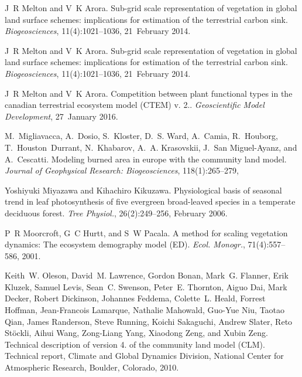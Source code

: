 \begin{DoxyDescription}
\item[\label{_CITEREF_Melton2014-xk}%
\mbox{[}40\mbox{]}]J~R Melton and V~K Arora. Sub-\/grid scale representation of vegetation in global land surface schemes\+: implications for estimation of the terrestrial carbon sink. {\itshape Biogeosciences}, 11(4)\+:1021--1036, 21~February 2014. 


\item[\label{_CITEREF_Melton2014-xy}%
\mbox{[}41\mbox{]}]J~R Melton and V~K Arora. Sub-\/grid scale representation of vegetation in global land surface schemes\+: implications for estimation of the terrestrial carbon sink. {\itshape Biogeosciences}, 11(4)\+:1021--1036, 21~February 2014. 


\item[\label{_CITEREF_Melton2016-zx}%
\mbox{[}42\mbox{]}]J~R Melton and V~K Arora. Competition between plant functional types in the canadian terrestrial ecosystem model (C\+T\+E\+M) v. 2.. {\itshape Geoscientific Model Development}, 27~January 2016. 


\item[\label{_CITEREF_Migliavacca2013-eh}%
\mbox{[}43\mbox{]}]M.~Migliavacca, A.~Dosio, S.~Kloster, D.~S. Ward, A.~Camia, R.~Houborg, T.~Houston~Durrant, N.~Khabarov, A.~A. Krasovskii, J.~San Miguel-\/\+Ayanz, and A.~Cescatti. Modeling burned area in europe with the community land model. {\itshape Journal of Geophysical Research\+: Biogeosciences}, 118(1)\+:265--279,
\begin{DoxyEnumerate}
\item 
\end{DoxyEnumerate}


\item[\label{_CITEREF_Miyazawa2006-so}%
\mbox{[}44\mbox{]}]Yoshiyuki Miyazawa and Kihachiro Kikuzawa. Physiological basis of seasonal trend in leaf photosynthesis of five evergreen broad-\/leaved species in a temperate deciduous forest. {\itshape Tree Physiol.}, 26(2)\+:249--256, February 2006.


\item[\label{_CITEREF_Moorcroft2001-co}%
\mbox{[}45\mbox{]}]P~R Moorcroft, G~C Hurtt, and S~W Pacala. A method for scaling vegetation dynamics\+: The ecosystem demography model (E\+D). {\itshape Ecol. Monogr.}, 71(4)\+:557--586, 2001. 


\item[\label{_CITEREF_Oleson2010-c88}%
\mbox{[}46\mbox{]}]Keith~W. Oleson, David~M. Lawrence, Gordon Bonan, Mark~G. Flanner, Erik Kluzek, Samuel Levis, Sean~C. Swenson, Peter~E. Thornton, Aiguo Dai, Mark Decker, Robert Dickinson, Johannes Feddema, Colette~L. Heald, Forrest Hoffman, Jean-\/\+Francois Lamarque, Nathalie Mahowald, Guo-\/\+Yue Niu, Taotao Qian, James Randerson, Steve Running, Koichi Sakaguchi, Andrew Slater, Reto Stöckli, Aihui Wang, Zong-\/\+Liang Yang, Xiaodong Zeng, and Xubin Zeng. Technical description of version 4. of the community land model (C\+L\+M). Technical report, Climate and Global Dynamics Division, National Center for Atmospheric Research, Boulder, Colorado, 2010.



\end{DoxyDescription}
